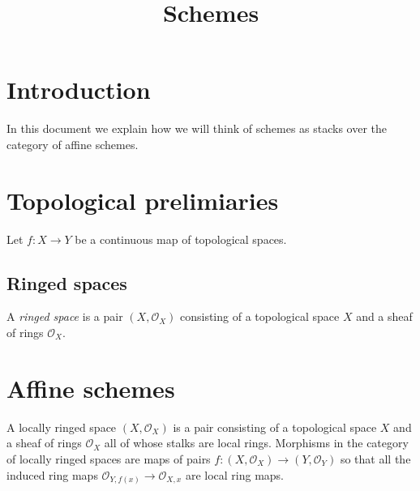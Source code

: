 

%


\title{Schemes}


\maketitle

\tableofcontents

\section{Introduction}
\label{section-introduction}

\noindent
In this document we explain how we will think of schemes as stacks over the
category of affine schemes.

\section{Topological prelimiaries}
\label{section-preliminaries}

\noindent
Let $f : X \to Y$ be a continuous map of topological spaces.


\subsection{Ringed spaces}
\label{subsection-ringed-sapces}

\begin{definition}
\label{definition-ringed-space}
A {\it ringed space} is a pair $(X, \mathcal{O}_X)$
consisting of a topological space $X$ and a sheaf of rings
$\mathcal{O}_X$.
\end{definition}

\section{Affine schemes}
\label{section-schemes}

A locally ringed space $(X,\mathcal{O}_X)$ is a pair consisting of a
topological space $X$ and a sheaf of rings $\mathcal{O}_X$ all of whose stalks
are local rings. Morphisms in the category of locally ringed spaces are
maps of pairs $f : (X, \mathcal{O}_X) \to (Y,\mathcal{O}_Y)$ so that
all the induced ring maps $\mathcal{O}_{Y,f(x)} \to \mathcal{O}_{X,x}$ are
local ring maps.

